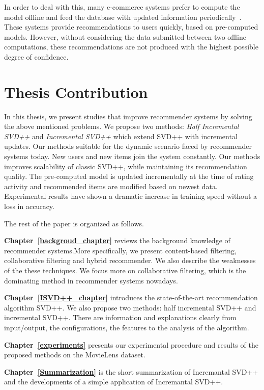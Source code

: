 \documentclass[oneside,13pt]{extreport}
\begin{document}
In order to deal with this, many e-commerce systems prefer to compute the model offline and feed the database with updated information periodically~\cite{Linden}. These systems provide recommendations to users quickly, based on pre-computed models. However, without considering the data submitted between two offline computations, these recommendations  are not produced with the highest possible degree of confidence.

\section{Thesis Contribution}
In this thesis, we present studies that improve recommender systems by solving the above mentioned problems. We propose two methods: \emph{Half Incremental SVD++} and \emph{Incremental SVD++} which extend SVD++ with incremental updates. Our methods suitable for the dynamic scenario faced by recommender systems today. New users and new items join the system constantly. Our methods improves scalability of classic SVD++, while maintaining its recommendation quality. The pre-computed model is updated incrementally at the time of rating activity and recommended items are modified based on newest data. Experimental results have shown a dramatic increase in training speed without a loss in accuracy.

The rest of the paper is organized as follows.
\begin{description}
    \item{\textbf{Chapter~\ref{backgroud_chapter}}} reviews the background knowledge of recommender systems.More specifically, we present content-based filtering, collaborative filtering and hybrid recommender. We also describe the weaknesses of the these techniques. We focus more on collaborative filtering, which is the dominating method in recommender systems nowadays.
    \item{\textbf{Chapter~\ref{ISVD++_chapter}}} introduces the state-of-the-art recommendation algorithm SVD++. We also propose two methods: half incremental SVD++ and incremental SVD++. There are information and explanations clearly from input/output, the configurations, the features to the analysis of the algorithm.
	\item{\textbf{Chapter~\ref{experiments}}} presents our experimental procedure and results of the proposed methods on the MovieLens dataset. 
    \item{\textbf{Chapter~\ref{Summarization}}} is the short summarization of Incremantal SVD++ and the developments of a simple application of Incremantal SVD++.
    
\end{description}
\end{document}
